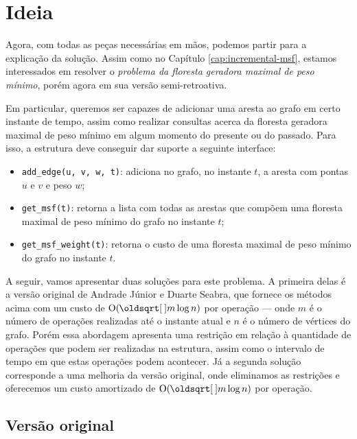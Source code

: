 \section{Ideia}
\label{sec:rmsf-ideia}

Agora, com todas as peças necessárias em mãos, podemos partir para a explicação da solução. Assim como no Capítulo \ref{cap:incremental-msf}, estamos interessados em resolver o \emph{problema da floresta geradora maximal de peso mínimo}, porém agora em sua versão semi-retroativa.

Em particular, queremos ser capazes de adicionar uma aresta ao grafo em certo instante de tempo, assim como realizar consultas acerca da floresta geradora maximal de peso mínimo em algum momento do presente ou do passado. Para isso, a estrutura deve conseguir dar suporte a seguinte interface:

\begin{itemize}
    \item \texttt{add\_edge(u, v, w, t)}: adiciona no grafo, no instante $t$, a aresta com pontas $u$ e $v$ e peso $w$;
    \item \texttt{get\_msf(t)}: retorna a lista com todas as arestas que compõem uma floresta maximal de peso mínimo do grafo no instante $t$;
    \item \texttt{get\_msf\_weight(t)}: retorna o custo de uma floresta maximal de peso mínimo do grafo no instante $t$.
\end{itemize}

A seguir, vamos apresentar duas soluções para este problema. A primeira delas é a versão original de Andrade Júnior e Duarte Seabra, que fornece os métodos acima com um custo de $\Oh(\sqrt{m} \log n)$ por operação --- onde $m$ é o número de operações realizadas até o instante atual e $n$ é o número de vértices do grafo. Porém essa abordagem apresenta uma restrição em relação à quantidade de operações que podem ser realizadas na estrutura, assim como o intervalo de tempo em que estas operações podem acontecer. Já a segunda solução corresponde a uma melhoria da versão original, onde eliminamos as restrições e oferecemos um custo amortizado de $\Oh(\sqrt{m} \log n)$ por operação.

\subsection{Versão original}
\label{sec:rmsf-versao-ori}

